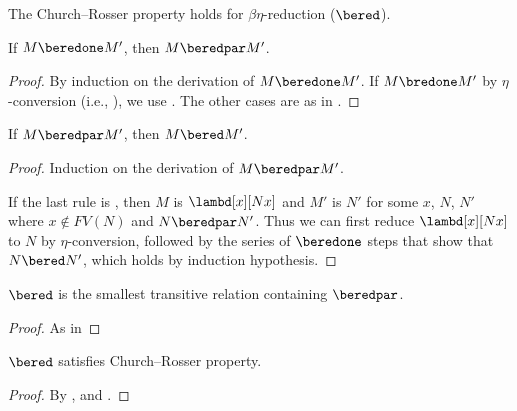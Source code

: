 \documentclass[../../../include/open-logic-section]{subfiles}
\begin{document}

The Church--Rosser property holds for
$\beta\eta$-reduction ($\bered$).

\begin{lem}
  If $M \beredone M'$, then $M \beredpar M'$.
\end{lem}

\begin{proof} 
  By induction on the derivation of $M \beredone M'$. If $M \bredone
  M'$ by $\eta$-conversion (i.e., ), we
  use . The other cases are as in
  .
\end{proof}


\begin{lem}
  If $M \beredpar M'$, then $M \bered M'$.
\end{lem}

\begin{proof} Induction on the derivation of $M \beredpar M'$.

  If the last rule is , then $M$ is
  $\lambd[x][Nx]$ and $M'$ is $N'$ for some $x$, $N$, $N'$ where $x
  \notin FV(N)$ and $N \beredpar N'$. Thus we can first reduce
  $\lambd[x][Nx]$ to $N$ by $\eta$-conversion, followed
  by the series of $\beredone$ steps that show that $N \bered N'$,
  which  holds by induction hypothesis.
\end{proof}


\begin{lem}
  $\bered$ is the smallest transitive relation containing $\beredpar$.
\end{lem}

\begin{proof}
  As in 
\end{proof}

\begin{thm}
  $\bered$ satisfies Church--Rosser property.
\end{thm}

\begin{proof}
  By ,  and .
\end{proof}
\end{document}
